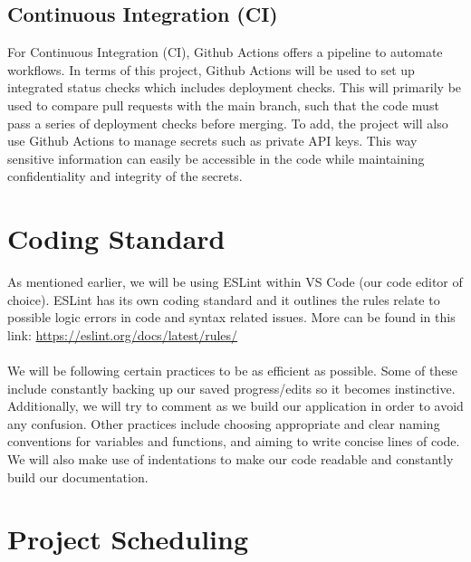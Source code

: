 \documentclass{article}
\begin{document}
\subsection{Continuous Integration (CI)}
For Continuous Integration (CI), Github Actions offers a pipeline to automate workflows. In terms of this project, Github Actions will be used to set up integrated status checks which includes deployment checks. This will primarily be used to compare pull requests with the main branch, such that the code must pass a series of deployment checks before merging. To add, the project will also use Github Actions to manage secrets such as private API keys. This way sensitive information can easily be accessible in the code while maintaining confidentiality and integrity of the secrets.

\section{Coding Standard}
As mentioned earlier, we will be using ESLint within VS Code (our code editor of choice). ESLint has its own coding standard and it outlines the rules relate to possible logic errors in code and syntax related issues. More can be found in this link: \url{https://eslint.org/docs/latest/rules/}
\\ \\
We will be following certain practices to be as efficient as possible. Some of these include constantly backing up our saved progress/edits so it becomes instinctive. Additionally, we will try to comment as we build our application in order to avoid any confusion. Other practices include choosing appropriate and clear naming conventions for variables and functions, and aiming to write concise lines of code. We will also make use of indentations to make our code readable and constantly build our documentation. 

\section{Project Scheduling}
\end{document}
